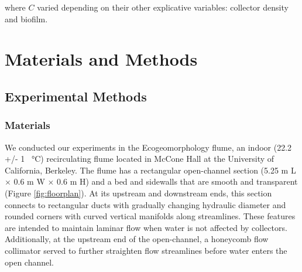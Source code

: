 \documentclass[geosciences,article,submit,moreauthors,pdftex]{Definitions/mdpi}
\begin{document}
\noindent where $C$ varied depending on their other explicative variables: collector density and biofilm.

\section{Materials and Methods}

\subsection{Experimental Methods}

\subsubsection{Materials}

We conducted our experiments in the Ecogeomorphology flume, an indoor (22.2 +/- 1 \SI{}{\celsius}) recirculating flume located in McCone Hall at the University of California, Berkeley. The flume has a rectangular open-channel section (5.25 m L $\times$ 0.6 m W $\times$ 0.6 m H) and a bed and sidewalls that are smooth and transparent (Figure \ref{fig:floorplan}). At its upstream and downstream ends, this section connects to rectangular ducts with gradually changing hydraulic diameter and rounded corners with curved vertical manifolds along streamlines. These features are intended to maintain laminar flow when water is not affected by collectors. Additionally, at the upstream end of the open-channel, a honeycomb flow collimator served to further straighten flow streamlines before water enters the open channel. 
\end{document}
